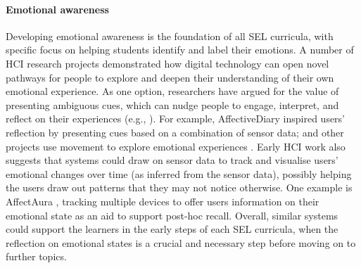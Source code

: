 \documentclass[prodmode,acmtochi]{acmsmall}
\newcommand{\Geraldine}[1]{\textrm{\textbf{\textcolor{Orange}{[[#1]]}}}}
\begin{document}
        \paragraph{Emotional awareness}
        \label{sec:emaware}
Developing emotional awareness is the foundation of all SEL curricula, with specific focus on helping students identify and label their emotions. A number of HCI research projects demonstrated how digital technology can open novel pathways for people to explore and deepen their understanding of their own emotional experience. As one option, researchers have argued for the value of presenting ambiguous cues, which can nudge people to engage, interpret, and reflect on their experiences (e.g., \cite{Boehner2005,Gaver2003}). For example, AffectiveDiary  \cite{Stahl2008,Sengers2007,Hook2008} inspired users' reflection by presenting cues based on a combination of sensor data; and other projects use movement to explore emotional experiences \cite{Mentis2014}. Early HCI work also suggests that systems could draw on sensor data to track and visualise users' emotional changes over time (as inferred from the sensor data), possibly helping the users draw out patterns that they may not notice otherwise. One example is AffectAura \cite{McDuff2012}, tracking multiple devices to offer users information on their emotional state as an aid to support post-hoc recall. 
%
Overall, similar systems could support the learners in the early steps of each SEL curricula, when the reflection on emotional states is a crucial and necessary step before moving on to further topics. 

%
\end{document}
